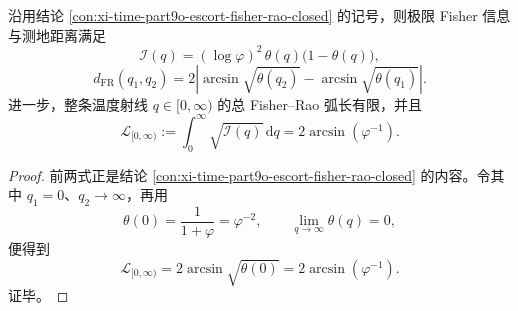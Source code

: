 \begin{corollary}\label{cor:xi-time-part9ob-escort-fisher-total-length}
沿用结论 \ref{con:xi-time-part9o-escort-fisher-rao-closed} 的记号，则极限 Fisher 信息与测地距离满足
\[
\mathcal I(q)
=
(\log\varphi)^2\,\theta(q)\bigl(1-\theta(q)\bigr),
\]
\[
d_{\mathrm{FR}}(q_1,q_2)
=
2\left|
\arcsin\sqrt{\theta(q_2)}-\arcsin\sqrt{\theta(q_1)}
\right|.
\]
进一步，整条温度射线 \(q\in[0,\infty)\) 的总 Fisher--Rao 弧长有限，并且
\[
\mathcal L_{[0,\infty)}
:=
\int_0^\infty \sqrt{\mathcal I(q)}\,\mathrm dq
=
2\arcsin(\varphi^{-1}).
\]
\end{corollary}
\begin{proof}
前两式正是结论 \ref{con:xi-time-part9o-escort-fisher-rao-closed} 的内容。令其中 \(q_1=0\)、\(q_2\to\infty\)，再用
\[
\theta(0)=\frac{1}{1+\varphi}=\varphi^{-2},
\qquad
\lim_{q\to\infty}\theta(q)=0,
\]
便得到
\[
\mathcal L_{[0,\infty)}
=
2\arcsin\sqrt{\theta(0)}
=
2\arcsin(\varphi^{-1}).
\]
证毕。
\end{proof}

